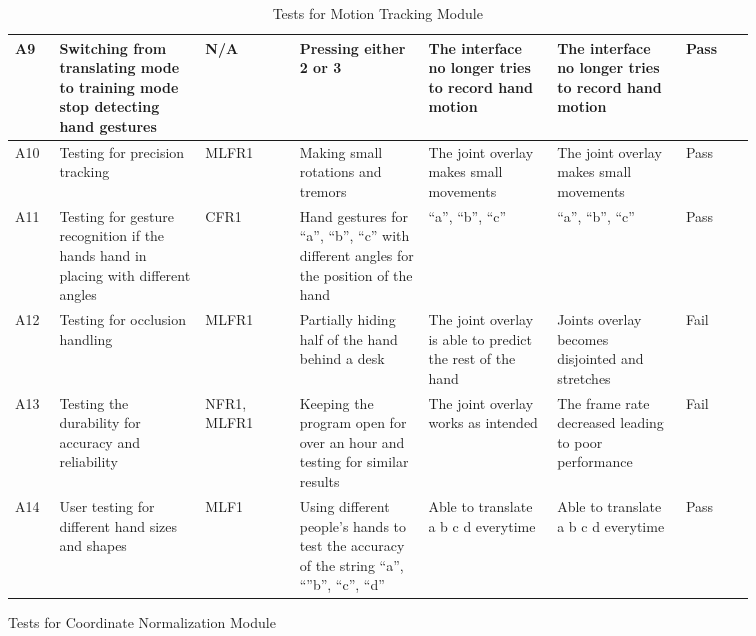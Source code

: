 \documentclass[12pt, titlepage]{article}
\begin{document}
\begin{longtable}{p{0.05\linewidth}|p{0.17\linewidth}|p{0.11\linewidth}|p{0.15\linewidth}|p{0.15\linewidth}|p{0.15\linewidth}|p{0.08\linewidth}}
A9 & Switching from translating mode to training mode stop detecting hand gestures & N/A & Pressing either 2 or 3 & The interface no longer tries to record hand motion & The interface no longer tries to record hand motion & Pass\\ \hline
A10 & Testing for precision tracking & MLFR1 & Making small rotations and tremors & The joint overlay makes small movements & The joint overlay makes small movements & Pass\\ \hline
A11 & Testing for gesture recognition if the hands hand in placing with different angles & CFR1 & Hand gestures for “a”, “b”, “c” with different angles for the position of the hand & “a”, “b”, “c” & “a”, “b”, “c” & Pass\\ \hline
A12 & Testing for occlusion handling & MLFR1 & Partially hiding half of the hand behind a desk & The joint overlay is able to predict the rest of the hand & Joints overlay becomes disjointed and stretches & Fail\\ \hline
A13 & Testing the durability for accuracy and reliability & NFR1, MLFR1 & Keeping the program open for over an hour and testing for similar results & The joint overlay works as intended & The frame rate decreased leading to poor performance & Fail\\ \hline
A14 & User testing for different hand sizes and shapes & MLF1 & Using different people’s hands to test the accuracy of the string “a”, “”b”, “c”, “d” & Able to translate a b c d everytime & Able to translate a b c d everytime & Pass
\hline
\caption{Tests for Motion Tracking Module}
\end{longtable}

\newpage
\centerline{Tests for Coordinate Normalization Module}
\end{document}
